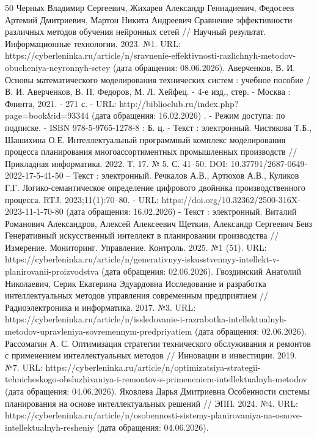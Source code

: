 \begin{thebibliography}{50}
 Черных Владимир Сергеевич, Жихарев Александр Геннадиевич, Федосеев Артемий Дмитриевич, Мартон Никита Андреевич Сравнение эффективности различных методов обучения нейронных сетей // Научный результат. Информационные технологии. 2023. №1. URL: https://cyberleninka.ru/article/n/sravnenie-effektivnosti-razlichnyh-metodov-obucheniya-neyronnyh-setey (дата обращения: 08.06.2026).
 Аверченков, В. И.    Основы математического моделирования технических систем : учебное пособие / В. И. Аверченков, В. П. Федоров, М. Л. Хейфец. - 4-е изд., стер. - Москва : Флинта, 2021. - 271 с. - URL: http://biblioclub.ru/index.php?page=book\&id=93344 (дата обращения: 16.02.2026) . - Режим доступа: по подписке. - ISBN 978-5-9765-1278-8 : Б. ц. - Текст : электронный.
 Чистякова  Т.Б., Шашихина О.Е. Интеллектуальный программный комплекс моделирования процесса планирования многоассортиментных промышленных производств // Прикладная информатика. 2022. Т. 17. № 5. С. 41–50. DOI: 10.37791/2687-0649-2022-17-5-41-50 – Текст : электронный.
 Речкалов А.В., Артюхов А.В., Куликов Г.Г. Логико-семантическое определение цифрового двойника производственного процесса. RTJ. 2023;11(1):70–80. - URL: https://doi.org/10.32362/2500-316X-2023-11-1-70-80 (дата обращения: 16.02.2026) - Текст : электронный.
 Виталий Романович Александров, Алексей Алексеевич Щеткин, Александр Сергеевич Бевз Генеративный искусственный интеллект в планировании производства // Измерение. Мониторинг. Управление. Контроль. 2025. №1 (51). URL: https://cyberleninka.ru/article/n/generativnyy-iskusstvennyy-intellekt-v-planirovanii-proizvodstva (дата обращения: 02.06.2026).
 Гвоздинский Анатолий Николаевич, Серик Екатерина Эдуардовна Исследование и разработка интеллектуальных методов управления современным предприятием // Радиоэлектроника и информатика. 2017. №3. URL: https://cyberleninka.ru/article/n/issledovanie-i-razrabotka-intellektualnyh-metodov-upravleniya-sovremennym-predpriyatiem (дата обращения: 02.06.2026).
 Рассомагин А. С. Оптимизация стратегии технического обслуживания и ремонтов с применением интеллектуальных методов // Инновации и инвестиции. 2019. №7. URL: https://cyberleninka.ru/article/n/optimizatsiya-strategii-tehnicheskogo-obsluzhivaniya-i-remontov-s-primeneniem-intellektualnyh-metodov (дата обращения: 04.06.2026).
 Яковлева Дарья Дмитриевна Особенности системы планирования на основе интеллектуальных решений // ЭПП. 2024. №4. URL: https://cyberleninka.ru/article/n/osobennosti-sistemy-planirovaniya-na-osnove-intellektualnyh-resheniy (дата обращения: 04.06.2026).

\end{thebibliography}
